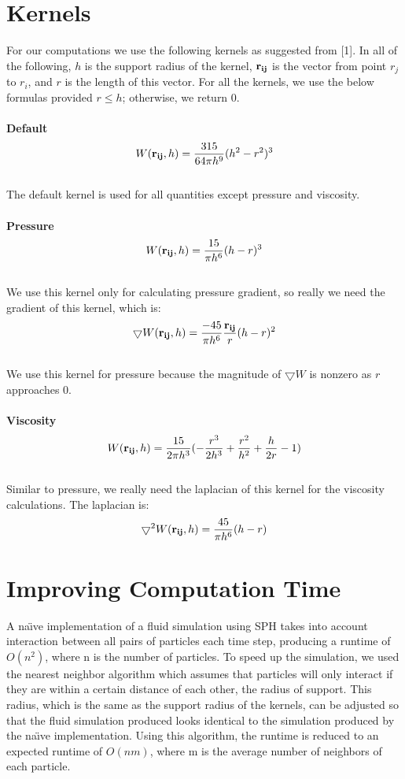 \documentclass[11pt]{article}
\begin{document}
\section*{Kernels}
For our computations we use the following kernels as suggested from [1]. In all of the following, $h$ is the support radius of the kernel, ${\bf r_{ij}}$ is the vector from point $r_j$ to $r_i$, and $r$ is the length of this vector. For all the kernels, we use the below formulas provided $r\leq h$; otherwise, we return $0$.\\ \\
{\bf Default}
$$W({\bf r_{ij}},h) = \frac{315}{64\pi h^9}(h^2 - r^2)^3 $$ \\
The default kernel is used for all quantities except pressure and viscosity.
\\
\\
{\bf Pressure}
$$ W({\bf r_{ij}},h) = \frac{15}{\pi h^6}(h-r)^3$$
\\
We use this kernel only for calculating pressure gradient, so really we need the gradient of this kernel, which is:
\\
$$\bigtriangledown W({\bf r_{ij}},h) = \frac{-45}{\pi h^6}\frac{{\bf r_{ij}}}{r}(h-r)^2$$
\\
We use this kernel for pressure because the magnitude of $\bigtriangledown W$ is nonzero as $r$ approaches $0$.
\\
\\
{\bf Viscosity}
$$W({\bf r_{ij}},h) = \frac{15}{2\pi h^3}(-\frac{r^3}{2h^3} + \frac{r^2}{h^2} + \frac{h}{2r} - 1) $$
\\
Similar to pressure, we really need the laplacian of this kernel for the viscosity calculations. The laplacian is:
\\
$$\bigtriangledown^2 W({\bf r_{ij}},h) = \frac{45}{\pi h^6}(h-r) $$


\section*{Improving Computation Time}
A  na\"{\i}ve implementation of a fluid simulation using SPH takes into account interaction between all pairs of particles each time step, producing a runtime of $O(n^2)$, where n is the number of particles. To speed up the simulation, we used the nearest neighbor algorithm which assumes that particles will only interact if they are within a certain distance of each other, the radius of support. This radius, which is the same as the support radius of the kernels, can be adjusted so that the fluid simulation produced looks identical to the simulation produced by the  na\"{\i}ve implementation. Using this algorithm, the runtime is reduced to an expected runtime of $O(nm)$, where m is the average number of neighbors of each particle.
\end{document}
